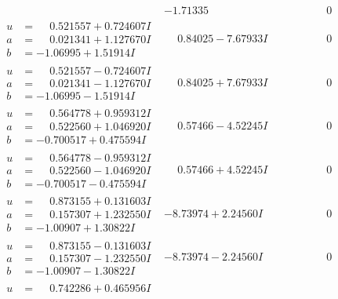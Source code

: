 \documentclass[1p]{elsarticle_modified}
\theoremstyle{definition}
\begin{document}
$$\begin{array}{c|c|c}
 & -1.71335\phantom{ +0.000000I} & \phantom{-0.000000 } 0 \\ \hline\begin{aligned}
u &= \phantom{-}0.521557 + 0.724607 I \\
a &= \phantom{-}0.021341 + 1.127670 I \\
b &= -1.06995 + 1.51914 I\end{aligned}
 & \phantom{-}0.84025 - 7.67933 I & \phantom{-0.000000 } 0 \\ \hline\begin{aligned}
u &= \phantom{-}0.521557 - 0.724607 I \\
a &= \phantom{-}0.021341 - 1.127670 I \\
b &= -1.06995 - 1.51914 I\end{aligned}
 & \phantom{-}0.84025 + 7.67933 I & \phantom{-0.000000 } 0 \\ \hline\begin{aligned}
u &= \phantom{-}0.564778 + 0.959312 I \\
a &= \phantom{-}0.522560 + 1.046920 I \\
b &= -0.700517 + 0.475594 I\end{aligned}
 & \phantom{-}0.57466 - 4.52245 I & \phantom{-0.000000 } 0 \\ \hline\begin{aligned}
u &= \phantom{-}0.564778 - 0.959312 I \\
a &= \phantom{-}0.522560 - 1.046920 I \\
b &= -0.700517 - 0.475594 I\end{aligned}
 & \phantom{-}0.57466 + 4.52245 I & \phantom{-0.000000 } 0 \\ \hline\begin{aligned}
u &= \phantom{-}0.873155 + 0.131603 I \\
a &= \phantom{-}0.157307 + 1.232550 I \\
b &= -1.00907 + 1.30822 I\end{aligned}
 & -8.73974 + 2.24560 I & \phantom{-0.000000 } 0 \\ \hline\begin{aligned}
u &= \phantom{-}0.873155 - 0.131603 I \\
a &= \phantom{-}0.157307 - 1.232550 I \\
b &= -1.00907 - 1.30822 I\end{aligned}
 & -8.73974 - 2.24560 I & \phantom{-0.000000 } 0 \\ \hline\begin{aligned}
u &= \phantom{-}0.742286 + 0.465956 I \\

\end{aligned}
\end{array}$$
\end{document}
